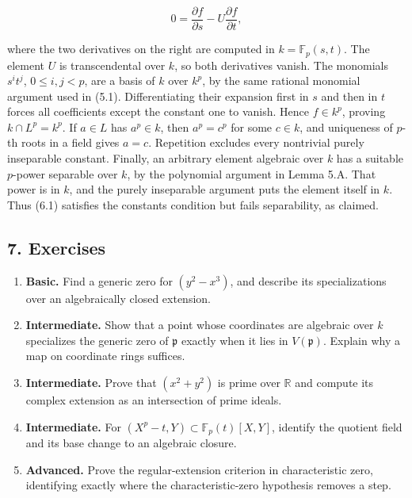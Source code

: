 \documentclass[
]{article}
\providecommand{\tightlist}{%
  \setlength{\itemsep}{0pt}\setlength{\parskip}{0pt}}
\begin{document}
\[
0=\frac{\partial f}{\partial s}-U\frac{\partial f}{\partial t},
\]

where the two derivatives on the right are computed in
\(k=\mathbb F_p(s,t)\). The element \(U\) is transcendental over \(k\),
so both derivatives vanish. The monomials \(s^it^j\), \(0\le i,j<p\),
are a basis of \(k\) over \(k^p\), by the same rational monomial
argument used in (5.1). Differentiating their expansion first in \(s\)
and then in \(t\) forces all coefficients except the constant one to
vanish. Hence \(f\in k^p\), proving \(k\cap L^p=k^p\). If \(a\in L\) has
\(a^p\in k\), then \(a^p=c^p\) for some \(c\in k\), and uniqueness of
\(p\)-th roots in a field gives \(a=c\). Repetition excludes every
nontrivial purely inseparable constant. Finally, an arbitrary element
algebraic over \(k\) has a suitable \(p\)-power separable over \(k\), by
the polynomial argument in Lemma 5.A. That power is in \(k\), and the
purely inseparable argument puts the element itself in \(k\). Thus (6.1)
satisfies the constants condition but fails separability, as claimed.

\subsection{7. Exercises}\label{exercises}

\begin{enumerate}
\def\labelenumi{\arabic{enumi}.}
\tightlist
\item
  \textbf{Basic.} Find a generic zero for \((y^2-x^3)\), and describe
  its specializations over an algebraically closed extension.
\item
  \textbf{Intermediate.} Show that a point whose coordinates are
  algebraic over \(k\) specializes the generic zero of \(\mathfrak p\)
  exactly when it lies in \(V(\mathfrak p)\). Explain why a map on
  coordinate rings suffices.
\item
  \textbf{Intermediate.} Prove that \((x^2+y^2)\) is prime over
  \(\mathbb R\) and compute its complex extension as an intersection of
  prime ideals.
\item
  \textbf{Intermediate.} For \((X^p-t,Y)\subset\mathbb F_p(t)[X,Y]\),
  identify the quotient field and its base change to an algebraic
  closure.
\item
  \textbf{Advanced.} Prove the regular-extension criterion in
  characteristic zero, identifying exactly where the characteristic-zero
  hypothesis removes a step.
\end{enumerate}
\end{document}
